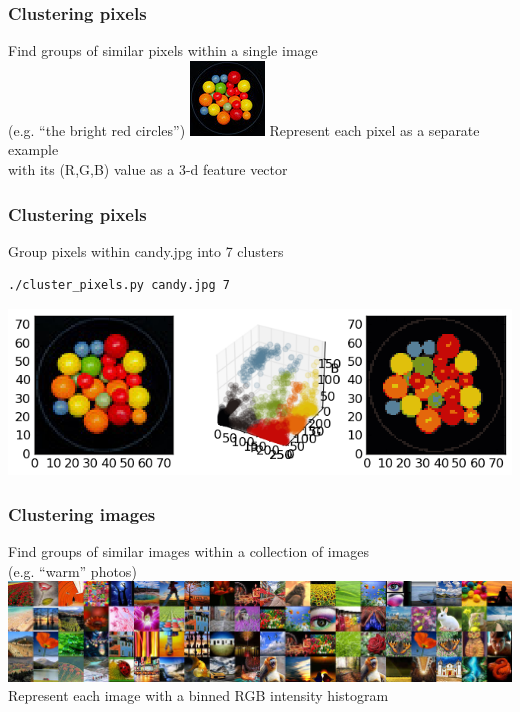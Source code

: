 \begin{frame}
  \frametitle{Clustering pixels}

  \begin{center}
    Find groups of similar pixels within a single image \\
    (e.g. ``the bright red circles'')
    \vskip20pt
    \includegraphics[height=0.25\textheight]{../../code/image_data/candy.jpg}
    \vskip20pt
    Represent each pixel as a separate example \\
    with its (R,G,B) value as a 3-d feature vector
  \end{center}

\end{frame}


\begin{frame}[fragile]
  \frametitle{Clustering pixels}

  \begin{center}

    \begin{block}{Group pixels within candy.jpg into 7 clusters}
        \begin{lstlisting}[language=bash]
 ./cluster_pixels.py candy.jpg 7
        \end{lstlisting}
    \end{block}
    \vskip20pt
    \includegraphics[width=\textwidth]{../../code/image_data/candy_clustered.png}
  \end{center}

\end{frame}

\begin{frame}
  \frametitle{Clustering images}

  \begin{center}
    Find groups of similar images within a collection of images \\
    (e.g. ``warm'' photos)
    \vskip20pt
    \includegraphics[height=0.25\textheight]{../../code/image_data/flickr_vivid_sample.png}
    \vskip20pt
    Represent each image with a binned RGB intensity histogram
  \end{center}

\end{frame}


